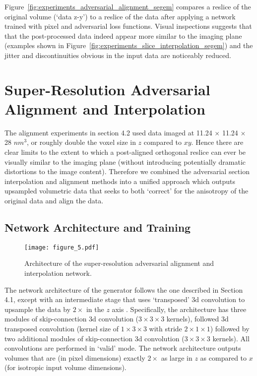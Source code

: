 \documentclass{article} %
\begin{document}
Figure~\ref{fig:experiments_adversarial_alignment_segem} compares a reslice of the original volume (`data z-y') to a reslice of the data after applying a network trained with pixel and adversarial loss functions. Visual inspections suggests that that the post-processed data indeed appear more similar to the imaging plane (examples shown in Figure~\ref{fig:experiments_slice_interpolation_segem}) and the jitter and discontinuities obvious in the input data are noticeably reduced. 

\section{Super-Resolution Adversarial Alignment and Interpolation}
The alignment experiments in section 4.2 used data imaged at 11.24 $\times$ 11.24 $\times$ 28 $nm^3$, or roughly double the voxel size in $z$ compared to $xy$. Hence there are clear limits to the extent to which a post-aligned orthogonal reslice can ever be visually similar to the imaging plane (without introducing potentially dramatic distortions to the image content). Therefore we combined the adversarial section interpolation and alignment methods into a unified approach which outputs upsampled volumetric data that seeks to both `correct' for the anisotropy of the original data and align the data.

\subsection{Network Architecture and Training}
\begin{figure}
    \centering
    \texttt{[image: figure\_5.pdf]}
    \caption{Architecture of the super-resolution adversarial alignment and interpolation network.}
    \label{fig:architecture_super_resolution}
\end{figure}

The network architecture of the generator follows the one described in Section 4.1, except with an intermediate stage that uses `transposed' 3d convolution to upsample the data by $2\times$ in the $z$ axis \cite{dumoulin2016guide}. Specifically, the architecture has three modules of skip-connection 3d convolution ($3\times3\times3$ kernels), followed 3d transposed convolution (kernel size of $1\times3\times3$ with stride $2\times1\times1$) followed by two additional modules of skip-connection 3d convolution ($3\times3\times3$ kernels). All convolutions are performed in `valid' mode. The network architecture outputs volumes that are (in pixel dimensions) exactly $2\times$ as large in $z$ as compared to $x$ (for isotropic input volume dimensions). 
\end{document}
